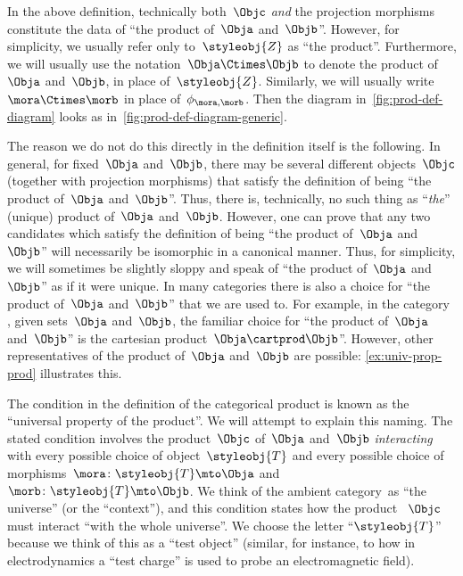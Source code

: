 \begin{remark}
    \label{prod unique up to iso}
    In the above definition, technically both~$\Objc$ \emph{and} the projection morphisms constitute the data of ``the product of~$\Obja$ and~$\Objb$''.
    However, for simplicity, we usually refer only to~$\styleobj{Z}$ as ``the product''.
    Furthermore, we will usually use the notation~$\Obja \Ctimes \Objb$ to denote the product of~$\Obja$ and~$\Objb$, in place of~$\styleobj{Z}$.
    Similarly, we will usually write~$\mora \Ctimes \morb$ in place of~$\phi_{\mora, \morb}$.
    Then the diagram in~\cref{fig:prod-def-diagram} looks as in~\cref{fig:prod-def-diagram-generic}.

    The reason we do not do this directly in the definition itself is the following.
    In general, for fixed~$\Obja$ and~$\Objb$, there may be several different objects~$\Objc$ (together with projection morphisms) that satisfy the definition of being ``the product of~$\Obja$ and~$\Objb$''.
    Thus, there is, technically, no such thing as ``\emph{the}'' (unique) product of~$\Obja$ and~$\Objb$.
    However, one can prove that any two candidates which satisfy the definition of being ``the product of~$\Obja$ and~$\Objb$'' will necessarily be isomorphic in a canonical manner.
    Thus, for simplicity, we will sometimes be slightly sloppy and speak of ``the product of~$\Obja$ and~$\Objb$'' as if it were unique.
    In many categories there is also a choice for ``the product of~$\Obja$ and~$\Objb$'' that we are used to.
    For example, in the category \Set, given sets~$\Obja$ and~$\Objb$, the familiar choice for ``the product of~$\Obja$ and~$\Objb$'' is the cartesian product~$\Obja \cartprod \Objb$''.
    However, other representatives of the product of~$\Obja$ and~$\Objb$ are possible: \cref{ex:univ-prop-prod} illustrates this.
\end{remark}

\begin{remark}
    The condition in the definition of the categorical product is known as the ``universal property of the product''.
    We will attempt to explain this naming.
    The stated condition involves the product~$\Objc$ of~$\Obja$ and~$\Objb$ \emph{interacting} with every possible choice of object~$\styleobj{T}$ and every possible choice of morphisms~$\mora \colon \styleobj{T} \mto \Obja$ and~$\morb\colon \styleobj{T} \mto \Objb$.
    We think of the ambient category~\CatC as ``the universe'' (or the ``context''), and this condition states how the product ~$\Objc$ must interact ``with the whole universe''.
    We choose the letter ``$\styleobj{T}$'' because we think of this as a ``test object'' (similar, for instance,  to how in electrodynamics a ``test charge'' is used to probe an electromagnetic field).
\end{remark}

